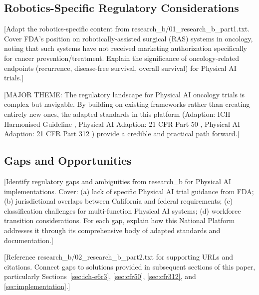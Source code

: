 \subsection{Robotics-Specific Regulatory Considerations}
\label{subsec:robotics-regulatory}

[Adapt the robotics-specific content from research\_b/01\_research\_b\_part1.txt.
Cover FDA's position on robotically-assisted surgical (RAS) systems in oncology,
noting that such systems have not received marketing authorization specifically
for cancer prevention/treatment. Explain the significance of oncology-related
endpoints (recurrence, disease-free survival, overall survival) for Physical AI
trials.]

[MAJOR THEME: The regulatory landscape for Physical AI oncology trials is
complex but navigable. By building on existing frameworks rather than creating
entirely new ones, the adapted standards in this platform (Adaption: ICH
Harmonised Guideline \cite{ich-adapt}, Physical AI Adaption: 21 CFR Part 50
\cite{cfr50-adapt}, Physical AI Adaption: 21 CFR Part 312 \cite{cfr312-adapt})
provide a credible and practical path forward.]

\subsection{Gaps and Opportunities}
\label{subsec:gaps-opportunities}

[Identify regulatory gaps and ambiguities from research\_b for Physical AI
implementations. Cover: (a) lack of specific Physical AI trial guidance from
FDA; (b) jurisdictional overlaps between California and federal requirements;
(c) classification challenges for multi-function Physical AI systems;
(d) workforce transition considerations. For each gap, explain how this
National Platform addresses it through its comprehensive body of adapted
standards and documentation.]

[Reference research\_b/02\_research\_b\_part2.txt for supporting URLs and
citations. Connect gaps to solutions provided in subsequent sections of this
paper, particularly Sections~\ref{sec:ich-e6r3}, \ref{sec:cfr50},
\ref{sec:cfr312}, and \ref{sec:implementation}.]
